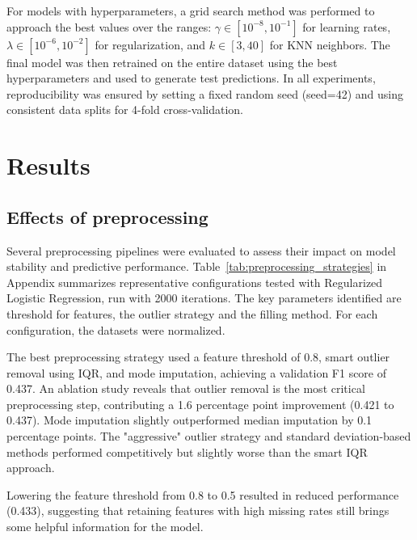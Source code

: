 \documentclass[10pt,conference,compsocconf]{IEEEtran}
\begin{document}
For models with hyperparameters, a grid search method was performed to approach the best values over the ranges: $\gamma \in [10^{-8}, 10^{-1}]$ for learning rates, $\lambda \in [10^{-6}, 10^{-2}]$ for regularization, and $k \in [3, 40]$ for KNN neighbors. The final model was then retrained on the entire dataset using the best hyperparameters and used to generate test predictions. In all experiments, reproducibility was ensured by setting a fixed random seed (seed=42) and using consistent data splits for 4-fold cross-validation.

\section{Results}
\label{sec:results}

\subsection{Effects of preprocessing}
Several preprocessing pipelines were evaluated to assess their impact on model stability and predictive performance. Table~\ref{tab:preprocessing_strategies} in Appendix summarizes representative configurations tested with Regularized Logistic Regression, run with 2000 iterations. The key parameters identified are threshold for features, the outlier strategy and the filling method. For each configuration, the datasets were normalized.

The best preprocessing strategy used a feature threshold of 0.8, smart outlier removal using IQR, and mode imputation, achieving a validation F1 score of 0.437. An ablation study reveals that outlier removal is the most critical preprocessing step, contributing a 1.6 percentage point improvement (0.421 to 0.437). Mode imputation slightly outperformed median imputation by 0.1 percentage points. The "aggressive" outlier strategy and standard deviation-based methods performed competitively but slightly worse than the smart IQR approach.

Lowering the feature threshold from 0.8 to 0.5 resulted in reduced performance (0.433), suggesting that retaining features with high missing rates still brings some helpful information for the model.
\end{document}
